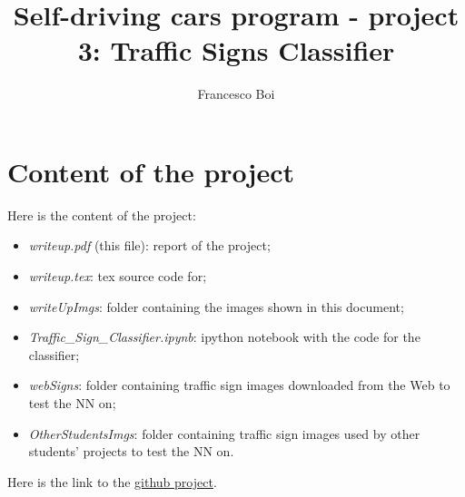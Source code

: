 \documentclass{article}
\author{Francesco Boi}
\title{Self-driving cars program - project  3: Traffic Signs Classifier}
\date{}
\begin{document}

\maketitle
\tableofcontents 

\lstset{escapechar=ç,style=customc}


\section{Content of the project}
Here is the content of the project:
\begin{itemize}
\item \textit{writeup.pdf} (this file): report of the project;
\item \textit{writeup.tex}: tex source code for;
\item \textit{writeUpImgs}: folder containing the images shown in this document;
\item \textit{Traffic\_Sign\_Classifier.ipynb}: ipython notebook with the code for the classifier;
\item \textit{webSigns}: folder containing traffic sign images downloaded from the Web to test the NN on;
\item \textit{OtherStudentsImgs}: folder containing traffic sign images used by other students' projects to test the NN on.
\end{itemize}

Here is the link to the \href{https://github.com/FrancescoBoi/UdaciytySDC-TrafficSignsClassifier}{github project}.
\end{document}
